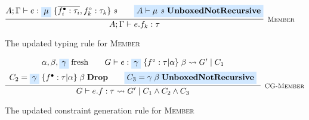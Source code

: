 \begin{figure}
    \centering
    \[
        \infer[\textsc{\footnotesize{Member}}]{
            A;\Gamma \vdash e.f_k : \tau
        }{
            A;\Gamma \vdash e : \colorbox{highlighteq}{$\mu$}\; \{ \overline{f_i^\bullet : \tau_i}, f_k^\circ : \tau_k \}\; s
            &\hspace{1em}
            \colorbox{highlighteq}{$A \vdash \mu \textit{ s } \textbf{UnboxedNotRecursive}$}
        }
    \]
    
    \caption{The updated typing rule for \textsc{Member}}
    \label{fig:membertypingrule}
\end{figure}

\begin{figure}
    \centering
    \[
        \infer[\textsc{\footnotesize{CG-Member}}]{
            G \vdash e.f : \tau \rightsquigarrow G'\; |\; C_1 \land C_2 \land C_3
        }{
            \begin{array}{c}
                \alpha, \beta, \colorbox{highlighteq}{$\gamma$}\; \text{fresh}
                \hspace{2em}
                G \vdash e : \colorbox{highlighteq}{$\gamma$}\; \{ f^\circ : \tau | \alpha \}\; \beta \rightsquigarrow G'\; |\; C_1 \\[5pt]
                C_2 = \colorbox{highlighteq}{$\gamma$}\; \{ f^\bullet : \tau | \alpha \}\; \beta\; \textbf{Drop}
                \hspace{2em}
                \colorbox{highlighteq}{$C_3 = \gamma\; \beta\; \textbf{UnboxedNotRecursive}$}
            \end{array}
        }
    \]
    
    \caption{The updated constraint generation rule for \textsc{Member}}
    \label{fig:memberconstraintgen}
\end{figure}

